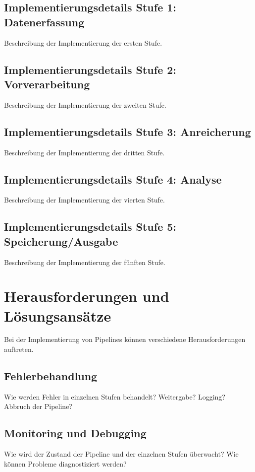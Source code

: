 \documentclass[a4paper]{article} %
\begin{document}
\subsection{Implementierungsdetails Stufe 1: Datenerfassung}
Beschreibung der Implementierung der ersten Stufe.
\blindtext[2]
\lipsum[11]

\subsection{Implementierungsdetails Stufe 2: Vorverarbeitung}
Beschreibung der Implementierung der zweiten Stufe.
\blindtext[2]
\lipsum[12]

\subsection{Implementierungsdetails Stufe 3: Anreicherung}
Beschreibung der Implementierung der dritten Stufe.
\blindtext[2]
\lipsum[13-14]

\subsection{Implementierungsdetails Stufe 4: Analyse}
Beschreibung der Implementierung der vierten Stufe.
\blindtext[2]
\lipsum[15-16]

\subsection{Implementierungsdetails Stufe 5: Speicherung/Ausgabe}
Beschreibung der Implementierung der fünften Stufe.
\blindtext[2]
\lipsum[17-18]


\section{Herausforderungen und Lösungsansätze}
Bei der Implementierung von Pipelines können verschiedene Herausforderungen auftreten.
\subsection{Fehlerbehandlung}
Wie werden Fehler in einzelnen Stufen behandelt? Weitergabe? Logging? Abbruch der Pipeline?
\lipsum[19-21]

\subsection{Monitoring und Debugging}
Wie wird der Zustand der Pipeline und der einzelnen Stufen überwacht? Wie können Probleme diagnostiziert werden?
\blindtext[3]
\lipsum[22]
\end{document}
